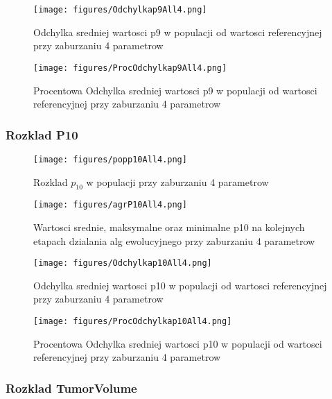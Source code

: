 \documentclass[]{article}
\begin{document}
\begin{figure}[htbp]
\centering
\texttt{[image: figures/Odchylkap9All4.png]}
\caption{Odchylka sredniej wartosci p9 w populacji od wartosci
referencyjnej przy zaburzaniu 4 parametrow}
\end{figure}

\begin{figure}[htbp]
\centering
\texttt{[image: figures/ProcOdchylkap9All4.png]}
\caption{Procentowa Odchylka sredniej wartosci p9 w populacji od
wartosci referencyjnej przy zaburzaniu 4 parametrow}
\end{figure}

\newpage

\subsubsection{Rozklad P10}\label{rozklad-p10}

\begin{figure}[htbp]
\centering
\texttt{[image: figures/popp10All4.png]}
\caption{Rozklad \(p_{10}\) w populacji przy zaburzaniu 4 parametrow}
\end{figure}

\begin{figure}[htbp]
\centering
\texttt{[image: figures/agrP10All4.png]}
\caption{Wartosci srednie, maksymalne oraz minimalne p10 na kolejnych
etapach dzialania alg ewolucyjnego przy zaburzaniu 4 parametrow}
\end{figure}

\begin{figure}[htbp]
\centering
\texttt{[image: figures/Odchylkap10All4.png]}
\caption{Odchylka sredniej wartosci p10 w populacji od wartosci
referencyjnej przy zaburzaniu 4 parametrow}
\end{figure}

\begin{figure}[htbp]
\centering
\texttt{[image: figures/ProcOdchylkap10All4.png]}
\caption{Procentowa Odchylka sredniej wartosci p10 w populacji od
wartosci referencyjnej przy zaburzaniu 4 parametrow}
\end{figure}

\newpage

\subsubsection{Rozklad TumorVolume}\label{rozklad-tumorvolume}
\end{document}
